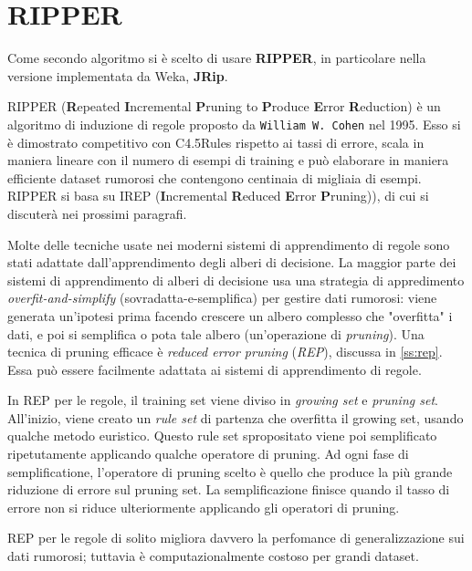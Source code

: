 \chapter{RIPPER}
\label{ch:jrip}

Come secondo algoritmo si è scelto di usare \textbf{RIPPER}\cite{Cohen95fasteffective}, in particolare nella versione implementata da Weka, \textbf{JRip}\cite{Witten:2011:DMP:1972514}.

RIPPER (\textbf{R}epeated \textbf{I}ncremental \textbf{P}runing to \textbf{P}roduce \textbf{E}rror \textbf{R}eduction) è un algoritmo di induzione di regole proposto da \verb|William W. Cohen| nel 1995. Esso si è dimostrato competitivo con C4.5Rules rispetto ai tassi di errore, scala in maniera lineare con il numero di esempi di training e può elaborare in maniera efficiente dataset rumorosi che contengono centinaia di migliaia di esempi. RIPPER si basa su IREP (\textbf{I}ncremental \textbf{R}educed \textbf{E}rror \textbf{P}runing))\cite{Furnkranz94incrementalreduced}, di cui si discuterà nei prossimi paragrafi.

Molte delle tecniche usate nei moderni sistemi di apprendimento di regole  sono stati adattate dall'apprendimento degli alberi di decisione. La maggior parte dei sistemi di apprendimento di alberi di decisione usa una strategia di appredimento \textit{overfit-and-simplify} (sovradatta-e-semplifica) per gestire dati rumorosi: viene generata un'ipotesi prima facendo crescere un albero complesso che "overfitta" i dati, e poi si semplifica o pota tale albero (un'operazione di \textit{pruning}). Una tecnica di pruning efficace è \textit{reduced error pruning} (\textit{REP}), discussa in \ref{ss:rep}. Essa può essere facilmente adattata ai sistemi di apprendimento di regole\cite{Pagallo1990}\cite{Brunk91aninvestigation}.

In REP per le regole, il training set viene diviso in \textit{growing set} e \textit{pruning set}. All'inizio, viene creato un \textit{rule set} di partenza che overfitta il growing set, usando qualche metodo euristico. Questo rule set spropositato viene poi semplificato ripetutamente applicando qualche operatore di pruning. Ad ogni fase di semplificatione, l'operatore di pruning scelto è quello che produce la più grande riduzione di errore sul pruning set. La semplificazione finisce quando il tasso di errore non si riduce ulteriormente applicando gli operatori di pruning.

REP per le regole di solito migliora davvero la perfomance di generalizzazione sui dati rumorosi\cite{Pagallo1990}\cite{Brunk91aninvestigation}\cite{Weiss91reducedcomplexity}\cite{Furnkranz94incrementalreduced}; tuttavia è computazionalmente costoso per grandi dataset\cite{Cohen93efficientpruning}.

